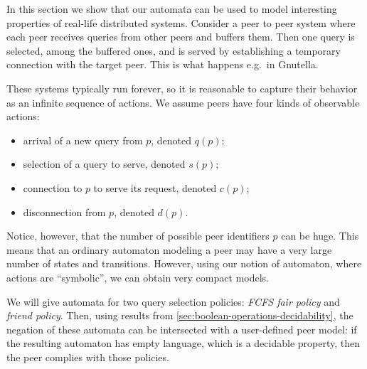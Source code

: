 
In this section we show that our automata can be used to model interesting properties of real-life distributed systems. Consider a peer to peer system where each peer receives queries from other peers and buffers them. Then one query is selected, among the buffered ones, and is served by establishing a temporary connection with the target peer. This is what happens e.g.\ in Gnutella.

These systems typically run forever, so it is reasonable to capture their behavior as an infinite sequence of actions. We assume peers have four kinds of observable actions: 
\begin{itemize}
	\item arrival of a new query from $p$, denoted $q(p)$; 
	\item selection of a query to serve, denoted $s(p)$; 
	\item connection to $p$ to serve its request, denoted $c(p)$; 
	\item disconnection from $p$, denoted $d(p)$.
\end{itemize}
%
Notice, however, that the number of possible peer identifiers $p$ can be huge. This means that an ordinary automaton modeling a peer may have a very large number of states and transitions. However, using our notion of automaton, where actions are ``symbolic'', we can obtain very compact models.

We will give automata for two query selection policies: \emph{FCFS fair policy} and \emph{friend policy}. Then, using results from \autoref{sec:boolean-operations-decidability}, the negation of these automata can be intersected with a user-defined peer model: if the resulting automaton has empty language, which is a decidable property, then the peer complies with those policies.



